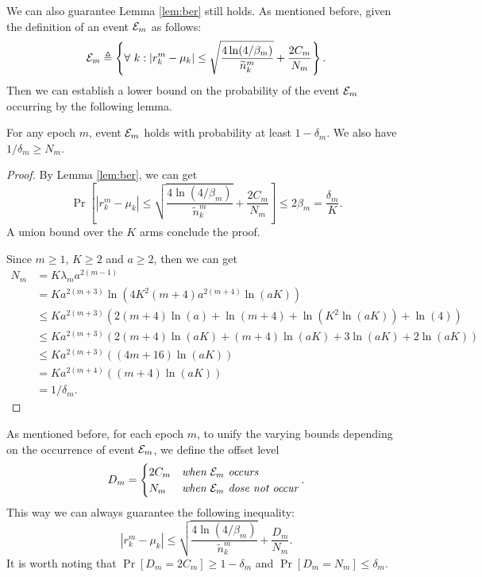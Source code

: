 We can also guarantee Lemma \ref{lem:ber} still holds. As mentioned before, given the definition of an event ${\mathcal{E}}_m$ as follows:
\begin{equation*}
    {\mathcal{E}}_m \triangleq \left\{ \forall\ k: |r_k^m - \mu_k| \leq \sqrt{\frac{4\ln(4 /\beta_m)}{\widetilde{n}_k^m}} + \frac{2C_m}{N_m} \right\}.
\end{equation*}
Then we can establish a lower bound on the probability of the event ${\mathcal{E}}_m$ occurring by the following lemma.
\begin{lemma}
\label{lem:bb-pem} %
     For any epoch $m$, event ${\mathcal{E}}_m$ holds with probability at least $1 - \delta_m$. We also have $1 / \delta_m \geq N_m$.
\end{lemma}
\begin{proof}
    By Lemma \ref{lem:ber}, we can get
    \[\Pr\left[|r_k^m - \mu_k| \leq \sqrt{\frac{4\ln(4 /\beta_m)}{\widetilde{n}_k^m}} + \frac{2C_m}{N_m}\right] \leq 2\beta_m = \frac{\delta_m}{K}.\]
    A union bound over the $K$ arms conclude the proof.

    Since $m \geq 1$, $K \geq 2$ and $a \geq 2$, then we can get
    \begin{align*}
        N_m &= K \lambda_m a^{2(m-1)} \\
        &= K a^{2(m+3)}\ln(4K^2(m+4) a^{2(m+4)}\ln(aK))  \\
        &\leq K a^{2(m+3)} (2(m+4)\ln(a) + \ln(m+4) + \ln(K^2\ln(aK)) + \ln(4)) \\
        &\leq K a^{2(m+3)}(2(m+4)\ln(aK)+ (m+4)\ln(aK) + 3\ln (aK) + 2\ln(aK)) \\
        &\leq K a^{2(m+3)} ((4m + 16)\ln(aK)) \\
        &= K a^{2(m+4)} ((m+4)\ln(aK)) \\
        &= 1 / \delta_m.
    \end{align*}
\end{proof}
As mentioned before, for each epoch $m$, to unify the varying bounds depending on the occurrence of event ${\mathcal{E}}_m$, we define the offset level
\[D_m = \begin{cases}
    2C_m & \textit{when ${\mathcal{E}}_m$ occurs} \\
    N_m & \textit{when ${\mathcal{E}}_m$ dose not occur}
\end{cases}.\]
This way we can always guarantee the following inequality:
\[|r_k^m - \mu_k| \leq \sqrt{\frac{4\ln(4 /\beta_m)}{\widetilde{n}_k^m}} + \frac{D_m}{N_m}.\]
It is worth noting that $\Pr[D_m = 2C_m] \geq 1 - \delta_m$ and $\Pr[D_m = N_m] \leq \delta_m$.

